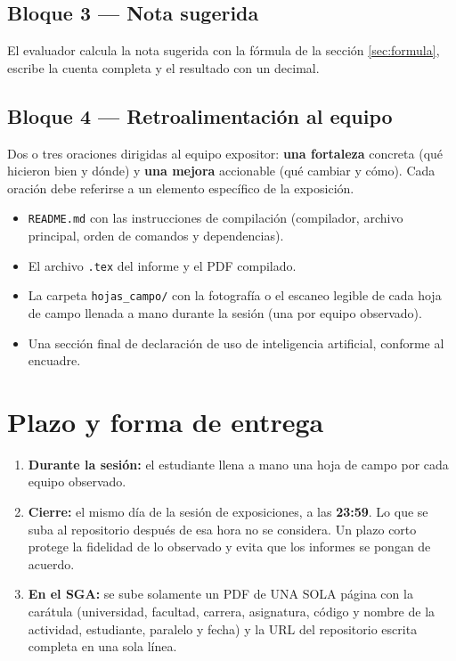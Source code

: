 \documentclass[11pt,a4paper]{article}
\begin{document}
\subsection{Bloque 3 --- Nota sugerida}

El evaluador calcula la nota sugerida con la fórmula de la sección \ref{sec:formula}, escribe la cuenta completa y el resultado con un decimal.

\subsection{Bloque 4 --- Retroalimentación al equipo}

Dos o tres oraciones dirigidas al equipo expositor: \textbf{una fortaleza} concreta (qué hicieron bien y dónde) y \textbf{una mejora} accionable (qué cambiar y cómo). Cada oración debe referirse a un elemento específico de la exposición.

\begin{infoBox}[title={Contenido obligatorio del repositorio}]
	\begin{itemize}
		\item \texttt{README.md} con las instrucciones de compilación (compilador, archivo principal, orden de comandos y dependencias).
		\item El archivo \texttt{.tex} del informe y el PDF compilado.
		\item La carpeta \texttt{hojas\_campo/} con la fotografía o el escaneo legible de cada hoja de campo llenada a mano durante la sesión (una por equipo observado).
		\item Una sección final de declaración de uso de inteligencia artificial, conforme al encuadre.
	\end{itemize}
\end{infoBox}

\section{Plazo y forma de entrega}\label{sec:plazo}

\begin{enumerate}
	\item \textbf{Durante la sesión:} el estudiante llena a mano una hoja de campo por cada equipo observado.
	\item \textbf{Cierre:} el mismo día de la sesión de exposiciones, a las \textbf{23:59}. Lo que se suba al repositorio después de esa hora no se considera. Un plazo corto protege la fidelidad de lo observado y evita que los informes se pongan de acuerdo.
	\item \textbf{En el SGA:} se sube solamente un PDF de UNA SOLA página con la carátula (universidad, facultad, carrera, asignatura, código y nombre de la actividad, estudiante, paralelo y fecha) y la URL del repositorio escrita completa en una sola línea.
\end{enumerate}
\end{document}
